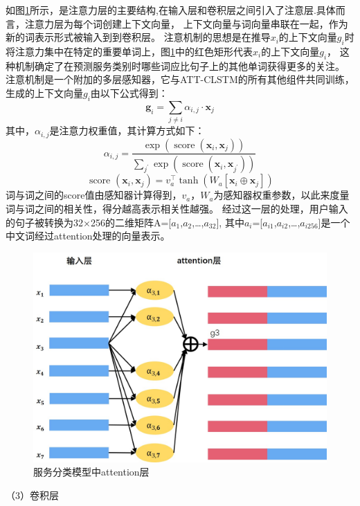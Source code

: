   如图\ref{fig:att-cnn}所示，是注意力层的主要结构,在输入层和卷积层之间引入了注意层.具体而言，注意力层为每个词创建上下文向量，
  上下文向量与词向量串联在一起，作为新的词表示形式被输入到到卷积层。 
  注意机制的思想是在推导$x_{i}$的上下文向量$g_{i}$时将注意力集中在特定的重要单词上，图\ref{fig:att-cnn}中的红色矩形代表$x_{i}$的上下文向量$g_{i}$，
  这种机制确定了在预测服务类别时哪些词应比句子上的其他单词获得更多的关注。
  注意机制是一个附加的多层感知器，它与ATT-CLSTM的所有其他组件共同训练，
  生成的上下文向量$g_{i}$由以下公式得到：
  \begin{equation}
  \mathbf{g}_{i}=\sum_{j \neq i} \alpha_{i, j} \cdot \mathbf{x}_{j}
\end{equation}
其中，$\alpha_{i, j}$是注意力权重值，其计算方式如下：
\begin{equation}
\alpha_{i, j}=\frac{\exp \left(\operatorname{score}\left(\mathbf{x}_{i}, \mathbf{x}_{j}\right)\right)}{\sum_{j^{\prime}} \exp \left(\operatorname{score}\left(\mathbf{x}_{i}, \mathbf{x}_{j^{\prime}}\right)\right)}
\end{equation}
\begin{equation}
\text { score }\left(\mathbf{x}_{i}, \mathbf{x}_{j}\right)=v_{a}^{\top} \tanh \left(W_{a}\left[\mathbf{x}_{i} \oplus \mathbf{x}_{j}\right]\right)
\end{equation}
词与词之间的score值由感知器计算得到，$v_{a}$，$W_{a}$为感知器权重参数，以此来度量词与词之间的相关性，得分越高表示相关性越强。
经过这一层的处理，用户输入的句子被转换为32×256的二维矩阵A=[$a_{1}$,$a_{2}$,\dots,$a_{32}$],
其中$a_{i}$=[$a_{i1}$,$a_{i2}$,\dots,$a_{i256}$]是一个中文词经过attention处理的向量表示。

\begin{figure}[htbp]
  \centering
  \includegraphics[scale=0.4]{./images/attcnn.jpg}
  \caption{服务分类模型中attention层}
  \label{fig:att-cnn}
\end{figure}
  （3）卷积层

